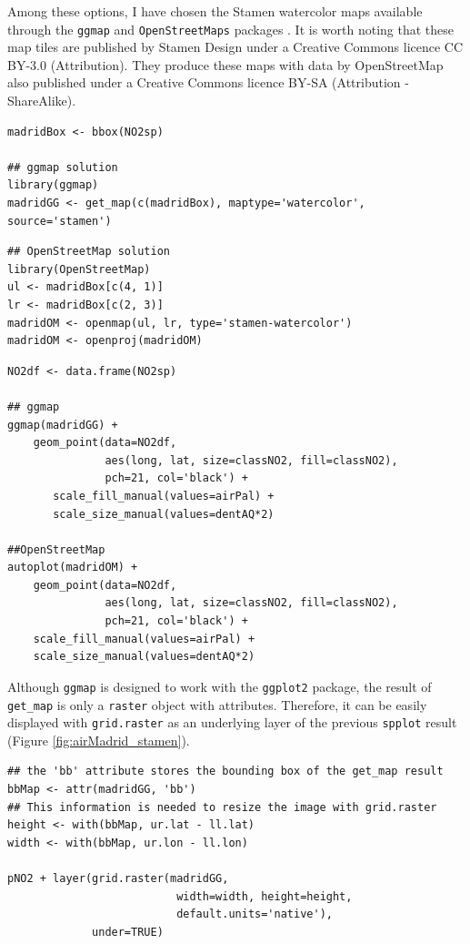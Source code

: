 \documentclass[smallroyalvopaper]{memoir}
\begin{document}
Among these options, I have chosen the Stamen watercolor maps
available through the \texttt{ggmap} \cite{Kahle.Wickham2013} and
\texttt{OpenStreetMaps} packages \cite{Fellows.Stotz2013}. It is worth noting
that these map tiles are published by Stamen Design under a Creative
Commons licence CC BY-3.0 (Attribution). They produce these maps with
data by OpenStreetMap also published under a Creative Commons licence
BY-SA (Attribution - ShareAlike).


\lstset{language=R,numbers=none}
\begin{lstlisting}
madridBox <- bbox(NO2sp)

## ggmap solution
library(ggmap)
madridGG <- get_map(c(madridBox), maptype='watercolor', source='stamen')
\end{lstlisting}

\lstset{language=R,numbers=none}
\begin{lstlisting}
## OpenStreetMap solution
library(OpenStreetMap)
ul <- madridBox[c(4, 1)]
lr <- madridBox[c(2, 3)]
madridOM <- openmap(ul, lr, type='stamen-watercolor')
madridOM <- openproj(madridOM)
\end{lstlisting}

\lstset{language=R,numbers=none}
\begin{lstlisting}
NO2df <- data.frame(NO2sp)

## ggmap
ggmap(madridGG) +
    geom_point(data=NO2df,
               aes(long, lat, size=classNO2, fill=classNO2),
               pch=21, col='black') +
       scale_fill_manual(values=airPal) +
       scale_size_manual(values=dentAQ*2)

##OpenStreetMap
autoplot(madridOM) + 
    geom_point(data=NO2df,
               aes(long, lat, size=classNO2, fill=classNO2),
               pch=21, col='black') +
    scale_fill_manual(values=airPal) +
    scale_size_manual(values=dentAQ*2)
\end{lstlisting}

Although \texttt{ggmap} is designed to work with the \texttt{ggplot2} package, the
result of \texttt{get\_map} is only a \texttt{raster} object with
attributes. Therefore, it can be easily displayed with \texttt{grid.raster}
as an underlying layer of the previous \texttt{spplot} result (Figure
\ref{fig:airMadrid_stamen}).

\lstset{language=R,numbers=none}
\begin{lstlisting}
## the 'bb' attribute stores the bounding box of the get_map result
bbMap <- attr(madridGG, 'bb')
## This information is needed to resize the image with grid.raster
height <- with(bbMap, ur.lat - ll.lat)
width <- with(bbMap, ur.lon - ll.lon)

pNO2 + layer(grid.raster(madridGG,
                          width=width, height=height,
                          default.units='native'),
             under=TRUE)
\end{lstlisting}
\end{document}
